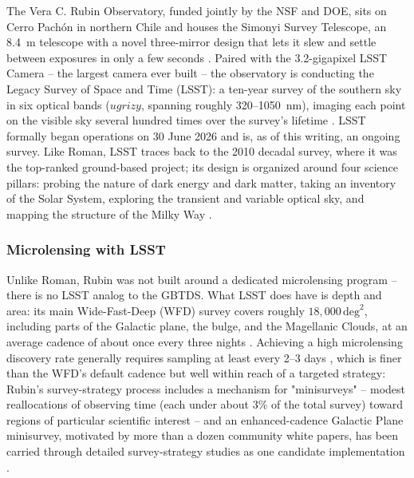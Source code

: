 \documentclass[english,10pt,a4paper]{article}
\begin{document}
	The Vera C. Rubin Observatory, funded jointly by the NSF and DOE, sits on Cerro Pach\'on in northern Chile and houses the Simonyi Survey Telescope, an 8.4~m telescope with a novel three-mirror design that lets it slew and settle between exposures in only a few seconds \cite{RubinAbout}. Paired with the 3.2-gigapixel LSST Camera -- the largest camera ever built -- the observatory is conducting the Legacy Survey of Space and Time (LSST): a ten-year survey of the southern sky in six optical bands ($ugrizy$, spanning roughly 320--1050~nm), imaging each point on the visible sky several hundred times over the survey's lifetime \cite{Ivezic2019LSST,RubinAbout}. LSST formally began operations on 30 June 2026 and is, as of this writing, an ongoing survey. Like Roman, LSST traces back to the 2010 decadal survey, where it was the top-ranked ground-based project; its design is organized around four science pillars: probing the nature of dark energy and dark matter, taking an inventory of the Solar System, exploring the transient and variable optical sky, and mapping the structure of the Milky Way \cite{RubinAbout,Ivezic2019LSST}.
	
	\subsubsection{Microlensing with LSST}
	\label{subsubsec:lsst_microlensing}
	
	Unlike Roman, Rubin was not built around a dedicated microlensing program -- there is no LSST analog to the GBTDS. What LSST does have is depth and area: its main Wide-Fast-Deep (WFD) survey covers roughly $18{,}000\,\mathrm{deg}^2$, including parts of the Galactic plane, the bulge, and the Magellanic Clouds, at an average cadence of about once every three nights \cite{Abrams2025MicrolensingRubin}. Achieving a high microlensing discovery rate generally requires sampling at least every 2--3 days \cite{Abrams2025MicrolensingRubin}, which is finer than the WFD's default cadence but well within reach of a targeted strategy: Rubin's survey-strategy process includes a mechanism for "minisurveys" -- modest reallocations of observing time (each under about 3\% of the total survey) toward regions of particular scientific interest -- and an enhanced-cadence Galactic Plane minisurvey, motivated by more than a dozen community white papers, has been carried through detailed survey-strategy studies as one candidate implementation \cite{Street2023GalacticPlane}.
	
\end{document}
